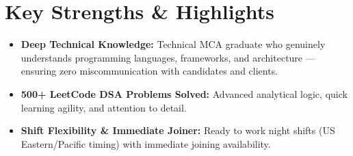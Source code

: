 \documentclass[a4paper,10pt]{article}
\begin{document}
\section*{Key Strengths \& Highlights}

\begin{itemize}

    \item \textbf{Deep Technical Knowledge:} Technical MCA graduate who genuinely understands programming languages, frameworks, and architecture — ensuring zero miscommunication with candidates and clients.

    \item \textbf{500+ LeetCode DSA Problems Solved:} Advanced analytical logic, quick learning agility, and attention to detail.

    \item \textbf{Shift Flexibility \& Immediate Joiner:} Ready to work night shifts (US Eastern/Pacific timing) with immediate joining availability.

\end{itemize}

\end{document}
